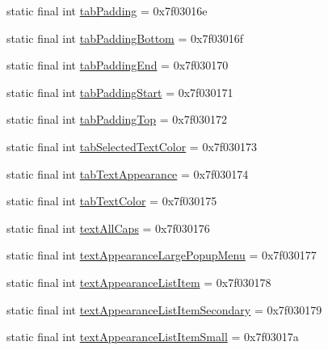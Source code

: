 \begin{DoxyCompactItemize}
\item 
static final int \mbox{\hyperlink{classandroid_1_1support_1_1design_1_1_r_1_1attr_a3a90a1dfd1478f5a9c0bc2a76f3ee8f9}{tab\+Padding}} = 0x7f03016e
\item 
static final int \mbox{\hyperlink{classandroid_1_1support_1_1design_1_1_r_1_1attr_a6d2423ea97ff731bf8b496c145453dd1}{tab\+Padding\+Bottom}} = 0x7f03016f
\item 
static final int \mbox{\hyperlink{classandroid_1_1support_1_1design_1_1_r_1_1attr_a25d1166da428a3dc79929e61da4de252}{tab\+Padding\+End}} = 0x7f030170
\item 
static final int \mbox{\hyperlink{classandroid_1_1support_1_1design_1_1_r_1_1attr_a00b1b6ab43f4c3c5f1dfcf5eabc6a4ac}{tab\+Padding\+Start}} = 0x7f030171
\item 
static final int \mbox{\hyperlink{classandroid_1_1support_1_1design_1_1_r_1_1attr_ab0be958901fbf172bc67a7f4bc1f05cf}{tab\+Padding\+Top}} = 0x7f030172
\item 
static final int \mbox{\hyperlink{classandroid_1_1support_1_1design_1_1_r_1_1attr_a56a5ff50e5095440d3066e6f3b932d1a}{tab\+Selected\+Text\+Color}} = 0x7f030173
\item 
static final int \mbox{\hyperlink{classandroid_1_1support_1_1design_1_1_r_1_1attr_aed3ef657b16086082eb107fc03a164bc}{tab\+Text\+Appearance}} = 0x7f030174
\item 
static final int \mbox{\hyperlink{classandroid_1_1support_1_1design_1_1_r_1_1attr_a208aa1427a7eeaee81f9154016d528d7}{tab\+Text\+Color}} = 0x7f030175
\item 
static final int \mbox{\hyperlink{classandroid_1_1support_1_1design_1_1_r_1_1attr_ab755ba74b4f994f36ce6d0a4644b696a}{text\+All\+Caps}} = 0x7f030176
\item 
static final int \mbox{\hyperlink{classandroid_1_1support_1_1design_1_1_r_1_1attr_a6a1db4cc00a586f8355a39fb984dfdca}{text\+Appearance\+Large\+Popup\+Menu}} = 0x7f030177
\item 
static final int \mbox{\hyperlink{classandroid_1_1support_1_1design_1_1_r_1_1attr_adb54fe09750c1f317ebcb76f3581535a}{text\+Appearance\+List\+Item}} = 0x7f030178
\item 
static final int \mbox{\hyperlink{classandroid_1_1support_1_1design_1_1_r_1_1attr_af4d372a9ba17fcf6ce061fc007d0e524}{text\+Appearance\+List\+Item\+Secondary}} = 0x7f030179
\item 
static final int \mbox{\hyperlink{classandroid_1_1support_1_1design_1_1_r_1_1attr_a88255c007925fe926ee195f8ecd9102c}{text\+Appearance\+List\+Item\+Small}} = 0x7f03017a

\end{DoxyCompactItemize}
